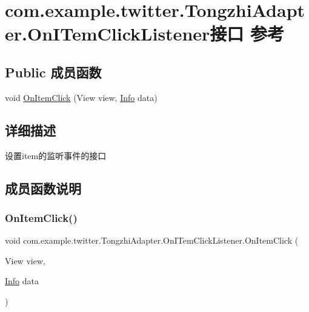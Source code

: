 \hypertarget{interfacecom_1_1example_1_1twitter_1_1_tongzhi_adapter_1_1_on_i_tem_click_listener}{}\section{com.\+example.\+twitter.\+Tongzhi\+Adapter.\+On\+I\+Tem\+Click\+Listener接口 参考}
\label{interfacecom_1_1example_1_1twitter_1_1_tongzhi_adapter_1_1_on_i_tem_click_listener}
\subsection*{Public 成员函数}
\begin{DoxyCompactItemize}
\item 
void \mbox{\hyperlink{interfacecom_1_1example_1_1twitter_1_1_tongzhi_adapter_1_1_on_i_tem_click_listener_a3501a888480dc913a06c304f99ba3b6c}{On\+Item\+Click}} (View view, \mbox{\hyperlink{classcom_1_1example_1_1twitter_1_1_info}{Info}} data)
\end{DoxyCompactItemize}


\subsection{详细描述}
设置item的监听事件的接口 

\subsection{成员函数说明}
\mbox{\label{interfacecom_1_1example_1_1twitter_1_1_tongzhi_adapter_1_1_on_i_tem_click_listener_a3501a888480dc913a06c304f99ba3b6c}} 
\subsubsection{\texorpdfstring{On\+Item\+Click()}{OnItemClick()}}
{\footnotesize\ttfamily void com.\+example.\+twitter.\+Tongzhi\+Adapter.\+On\+I\+Tem\+Click\+Listener.\+On\+Item\+Click (\begin{DoxyParamCaption}\item[{View}]{view,  }\item[{\mbox{\hyperlink{classcom_1_1example_1_1twitter_1_1_info}{Info}}}]{data }\end{DoxyParamCaption})}

